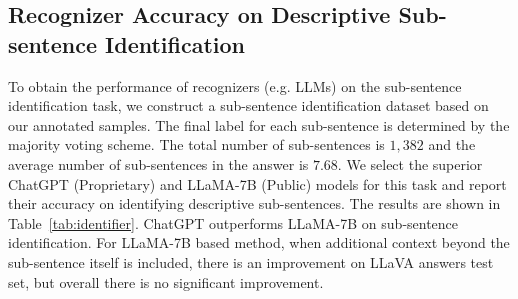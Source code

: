 \subsection{Recognizer Accuracy on Descriptive Sub-sentence Identification}
\label{sec:42}
To obtain the performance of recognizers (e.g. LLMs) on the sub-sentence identification task, we construct a sub-sentence identification dataset based on our annotated samples. The final label for each sub-sentence is determined by the majority voting scheme. The total number of sub-sentences is $1,382$ and the average number of sub-sentences in the answer is $7.68$. 
We select the superior ChatGPT (Proprietary) and LLaMA-7B (Public) models for this task and report their accuracy on identifying descriptive sub-sentences. The results are shown in Table~\ref{tab:identifier}. ChatGPT outperforms LLaMA-7B on sub-sentence identification. 
For LLaMA-7B based method, when additional context beyond the sub-sentence itself is included, there is an improvement on LLaVA answers test set, but overall there is no significant improvement. 



 

